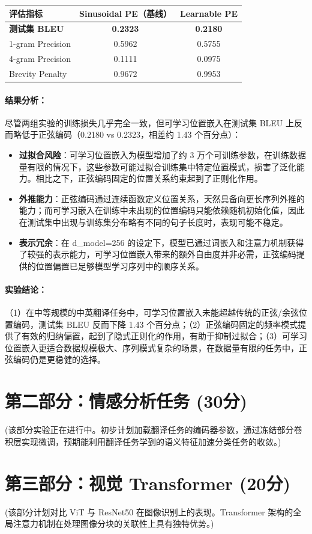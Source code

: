 \documentclass[11pt,a4paper]{article}
\begin{document}
\begin{table}[h]
\centering
\begin{tabular}{lcc}
\toprule
评估指标 & Sinusoidal PE（基线） & Learnable PE \\
\midrule
\textbf{测试集 BLEU} & \textbf{0.2323} & \textbf{0.2180} \\
1-gram Precision & 0.5962 & 0.5755 \\
4-gram Precision & 0.1111 & 0.0975 \\
Brevity Penalty & 0.9672 & 0.9953 \\
\bottomrule
\end{tabular}
\end{table}

\paragraph{结果分析：}
尽管两组实验的训练损失几乎完全一致，但可学习位置嵌入在测试集 BLEU 上反而略低于正弦编码（0.2180 vs 0.2323，相差约 1.43 个百分点）：

\begin{itemize}
    \item \textbf{过拟合风险}：可学习位置嵌入为模型增加了约 3 万个可训练参数，在训练数据量有限的情况下，这些参数可能过拟合训练集中特定位置模式，损害了泛化能力。相比之下，正弦编码固定的位置关系约束起到了正则化作用。
    \item \textbf{外推能力}：正弦编码通过连续函数定义位置关系，天然具备向更长序列外推的能力；而可学习嵌入在训练中未出现的位置编码只能依赖随机初始化值，因此在测试集中出现与训练集分布略有不同的句子长度时，表现可能不稳定。
    \item \textbf{表示冗余}：在 d\_model=256 的设定下，模型已通过词嵌入和注意力机制获得了较强的表示能力，可学习位置嵌入带来的额外自由度并非必需，正弦编码提供的位置偏置已足够模型学习序列中的顺序关系。
\end{itemize}

\paragraph{实验结论：}
（1）在中等规模的中英翻译任务中，可学习位置嵌入未能超越传统的正弦/余弦位置编码，测试集 BLEU 反而下降 1.43 个百分点；（2）正弦编码固定的频率模式提供了有效的归纳偏置，起到了隐式正则化的作用，有助于抑制过拟合；（3）可学习位置嵌入更适合数据规模极大、序列模式复杂的场景，在数据量有限的任务中，正弦编码仍是更稳健的选择。

\section{第二部分：情感分析任务 (30分)}
(该部分实验正在进行中。初步计划加载翻译任务的编码器参数，通过冻结部分卷积层实现微调，预期能利用翻译任务学到的语义特征加速分类任务的收敛。)

\section{第三部分：视觉 Transformer (20分)}
(该部分计划对比 ViT 与 ResNet50 在图像识别上的表现。Transformer 架构的全局注意力机制在处理图像分块的关联性上具有独特优势。)
\end{document}
